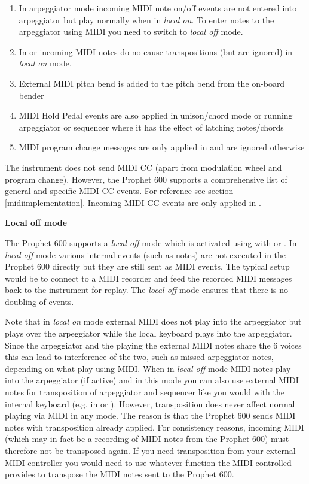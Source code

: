 \begin{enumerate}
  \setlength\itemsep{0cm}
  \item In arpeggiator mode incoming MIDI note on/off events are not entered into arpeggiator but play normally when in \textit{local on}. To enter notes to the arpeggiator using MIDI you need to switch to \textit{local off} mode. 
  \item In \shiftmode or \shiftlock incoming MIDI notes do no cause transpositions (but are ignored) in \textit{local on} mode. 
  \item External MIDI pitch bend is added to the pitch bend from the on-board bender 
  \item MIDI Hold Pedal events are also applied in unison/chord mode or running arpeggiator or sequencer where it has the effect of latching notes/chords
  \item MIDI program change messages are only applied in \presetmode and are ignored otherwise  
\end{enumerate}

The instrument does not send MIDI CC (apart from modulation wheel and program change). However, the Prophet 600 supports a comprehensive list of general and specific MIDI CC events. For reference see section \ref{midiimplementation}. Incoming MIDI CC events are only applied in \presetmode.

\textbf{Local off mode}

The Prophet 600 supports a \textit{local off} mode which is activated using  with \shiftmode or \shiftlock. In \textit{local off} mode various internal events (such as notes) are not executed in the Prophet 600 directly but they are still sent as MIDI events. The typical setup would be to connect to a MIDI recorder and feed the recorded MIDI messages back to the instrument for replay. The \textit{local off} mode ensures that there is no doubling of events.

Note that in \textit{local on} mode external MIDI does not play into the arpeggiator but plays over the arpeggiator while the local keyboard plays into the arpeggiator. Since the arpeggiator and the playing the external MIDI notes share the 6 voices this can lead to interference of the two, such as missed arpeggiator notes, depending on what play using MIDI. When in \textit{local off} mode MIDI notes play into the arpeggiator (if active) and in this mode you can also use external MIDI notes for transposition of arpeggiator and sequencer like you would with the internal keyboard (e.g. in \shiftmode or \shiftlock). However, transposition does never affect normal playing via MIDI in any mode. The reason is that the Prophet 600 sends MIDI notes with transposition already applied. For consistency reasons, incoming MIDI (which may in fact be a recording of MIDI notes from the Prophet 600) must therefore not be transposed again. If you need transposition from your external MIDI controller you would need to use whatever function the MIDI controlled provides to transpose the MIDI notes sent to the Prophet 600.

